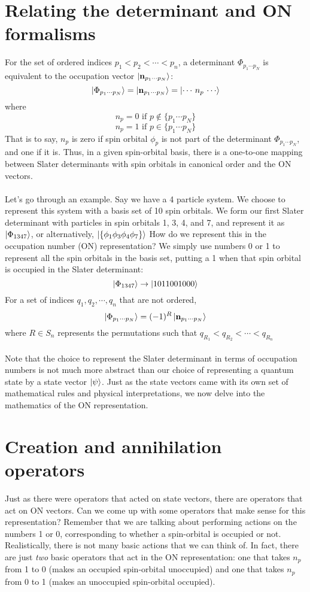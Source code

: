 \documentclass{article}
\begin{document}
\section{Relating the determinant and ON formalisms}

For the set of ordered indices $p_1 < p_2 < \cdots < p_n$, a determinant $\Phi_{p_1 \cdots p_N}$ is equivalent to the occupation vector $\ket{\mathbf{n}_{p_1 \cdots p_N}}$:
\[\ket{\Phi_{p_1 \cdots p_N}} = \ket{\bold{n}_{p_1 \cdots p_N}}= \ket{ \cdots \,  n_p \, \cdots }\] 
where
\[n_p = 0 \,\, \text{if $p \notin \{p_1 \cdots p_N\}$} \]
\[n_p = 1 \,\, \text{if $p \in \{p_1 \cdots p_N\}$} \]
That is to say, $n_p$ is zero if spin orbital $\phi_p$ is not part of the determinant $\Phi_{p_1 \cdots p_N}$, and one if it is. 
Thus, in a given spin-orbital basis, there is a one-to-one mapping between Slater determinants with spin orbitals in canonical order and the ON vectors. 
\\ \\ 
Let's go through an example. 
Say we have a 4 particle system. 
We choose to represent this system with a basis set of 10 spin orbitals. 
We form our first Slater determinant with particles in spin orbitals 1, 3, 4, and 7, and represent it as 
$\ket{\Phi_{1347}}$, or alternatively, $\ket{\{\phi_1\phi_3\phi_4\phi_7\}}$
How do we represent this in the  occupation number (ON) representation? 
We simply use numbers 0 or 1 to represent all the spin orbitals in the basis set, putting a 1 when that spin orbital is occupied in the Slater determinant: 
\[\ket{\Phi_{1347}} \rightarrow \ket{1011001000} \]
For a set of indices $q_1, q_2, \cdots, q_n$ that are not ordered, 
\[\ket{\Phi_{p_1 \cdots p_N}}  = (-1)^R \ket{\bold{n}_{p_1 \cdots p_N}}\]
where $R \in S_n$ represents the permutations such that $q_{R_1} < q_{R_2} < \cdots < q_{R_n}$ \\
\\
Note that the choice to represent the Slater determinant in terms of occupation numbers is not much more abstract than our choice 
of representing a quantum state by a state vector $\ket{\psi}$.
Just as the state vectors came with its own set of mathematical rules and physical interpretations, 
we now delve into the mathematics of the ON representation. 
\section{Creation and annihilation operators}
Just as there were operators that acted on state vectors, there are operators that act on ON vectors. 
Can we come up with some operators that make sense for this representation? 
Remember that we are talking about performing actions on the numbers 1 or 0, corresponding to whether a spin-orbital is occupied or not. 
Realistically, there is not many basic actions that we can think of. 
In fact, there are just \textit{two} basic operators that act in the ON representation:
one that takes $n_p$ from 1 to 0 (makes an occupied spin-orbital unoccupied) and one that takes $n_p$ from 0 to 1 (makes an unoccupied spin-orbital occupied). 
\end{document}
